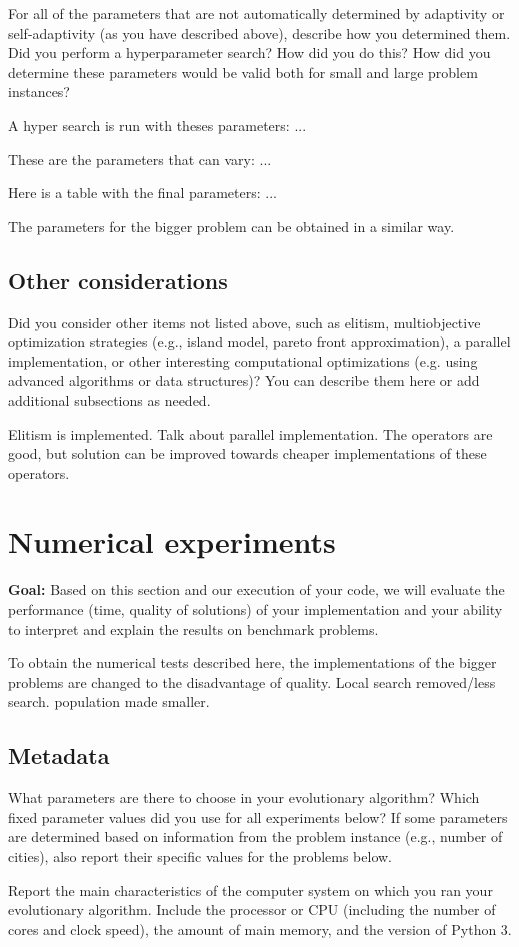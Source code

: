\documentclass[a4paper,10pt]{article}
\newcommand{\ReplaceMe}[1]{{\color{blue}#1}}
\newcommand{\RemoveMe}[1]{{\color{purple}#1}}
\begin{document}
\ReplaceMe{For all of the parameters that are not automatically determined by adaptivity or self-adaptivity (as you have described above), describe how you determined them. Did you perform a hyperparameter search? How did you do this? How did you determine these parameters would be valid both for small and large problem instances?}

A hyper search is run with theses parameters: ...

These are the parameters that can vary: ...

Here is a table with the final parameters: ...

The parameters for the bigger problem can be obtained in a similar way. 

\subsection{Other considerations}

\ReplaceMe{Did you consider other items not listed above, such as elitism, multiobjective optimization strategies (e.g., island model, pareto front approximation), a parallel implementation, or other interesting computational optimizations (e.g. using advanced algorithms or data structures)? You can describe them here or add additional subsections as needed.}

Elitism is implemented. Talk about parallel implementation. The operators are good, but solution can be improved towards cheaper implementations of these operators.


\section{Numerical experiments}

\RemoveMe{\textbf{Goal:} Based on this section and our execution of your code, we will evaluate the performance (time, quality of solutions) of your implementation and your ability to interpret and explain the results on benchmark problems.}

To obtain the numerical tests described here, the implementations of the bigger problems are changed to the disadvantage of quality. Local search removed/less search. population made smaller. 

\subsection{Metadata}

\ReplaceMe{What parameters are there to choose in your evolutionary algorithm? Which fixed parameter values did you use for all experiments below? If some parameters are determined based on information from the problem instance (e.g., number of cities), also report their specific values for the problems below.

Report the main characteristics of the computer system on which you ran your evolutionary algorithm. Include the processor or CPU (including the number of cores and clock speed), the amount of main memory, and the version of Python 3.}
\end{document}
